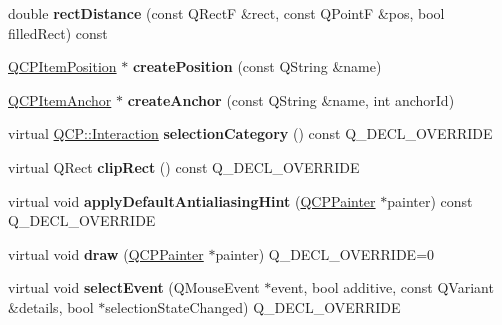 \begin{DoxyCompactItemize}
\item 
\mbox{\label{class_q_c_p_abstract_item_a7dfc2007e36d09b8b5c988a9f06d6a7e}} 
double {\bfseries rect\+Distance} (const Q\+RectF \&rect, const Q\+PointF \&pos, bool filled\+Rect) const
\item 
\mbox{\label{class_q_c_p_abstract_item_a75036d39c4d4e2e1a7dd145fff915d32}} 
\hyperlink{class_q_c_p_item_position}{Q\+C\+P\+Item\+Position} $\ast$ {\bfseries create\+Position} (const Q\+String \&name)
\item 
\mbox{\label{class_q_c_p_abstract_item_af3fc92527802078ca395138748b629a7}} 
\hyperlink{class_q_c_p_item_anchor}{Q\+C\+P\+Item\+Anchor} $\ast$ {\bfseries create\+Anchor} (const Q\+String \&name, int anchor\+Id)
\item 
\mbox{\label{class_q_c_p_abstract_item_af1e8300bcca1524f8602038d78492571}} 
virtual \hyperlink{namespace_q_c_p_a2ad6bb6281c7c2d593d4277b44c2b037}{Q\+C\+P\+::\+Interaction} {\bfseries selection\+Category} () const Q\+\_\+\+D\+E\+C\+L\+\_\+\+O\+V\+E\+R\+R\+I\+DE
\item 
\mbox{\label{class_q_c_p_abstract_item_a193ce2d0aea9466623d5a7de88596527}} 
virtual Q\+Rect {\bfseries clip\+Rect} () const Q\+\_\+\+D\+E\+C\+L\+\_\+\+O\+V\+E\+R\+R\+I\+DE
\item 
\mbox{\label{class_q_c_p_abstract_item_a85dfa6ccd355c86d44e784a75042cca1}} 
virtual void {\bfseries apply\+Default\+Antialiasing\+Hint} (\hyperlink{class_q_c_p_painter}{Q\+C\+P\+Painter} $\ast$painter) const Q\+\_\+\+D\+E\+C\+L\+\_\+\+O\+V\+E\+R\+R\+I\+DE
\item 
\mbox{\label{class_q_c_p_abstract_item_afe12c077663d07233a1b06608783ae41}} 
virtual void {\bfseries draw} (\hyperlink{class_q_c_p_painter}{Q\+C\+P\+Painter} $\ast$painter) Q\+\_\+\+D\+E\+C\+L\+\_\+\+O\+V\+E\+R\+R\+I\+DE=0
\item 
\mbox{\label{class_q_c_p_abstract_item_ada0abcc22693f5fc224c0acd5bd568ea}} 
virtual void {\bfseries select\+Event} (Q\+Mouse\+Event $\ast$event, bool additive, const Q\+Variant \&details, bool $\ast$selection\+State\+Changed) Q\+\_\+\+D\+E\+C\+L\+\_\+\+O\+V\+E\+R\+R\+I\+DE

\end{DoxyCompactItemize}
